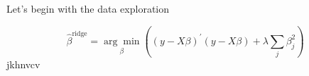 
Let's begin with the data exploration


$$\hat{\beta}^{\text {ridge}}=\underset{\beta}{\arg \min }\left((y-X \beta)^{\prime}(y-X \beta)+\lambda \sum_{j} \beta_{j}^{2}\right)$$
jkhnvcv